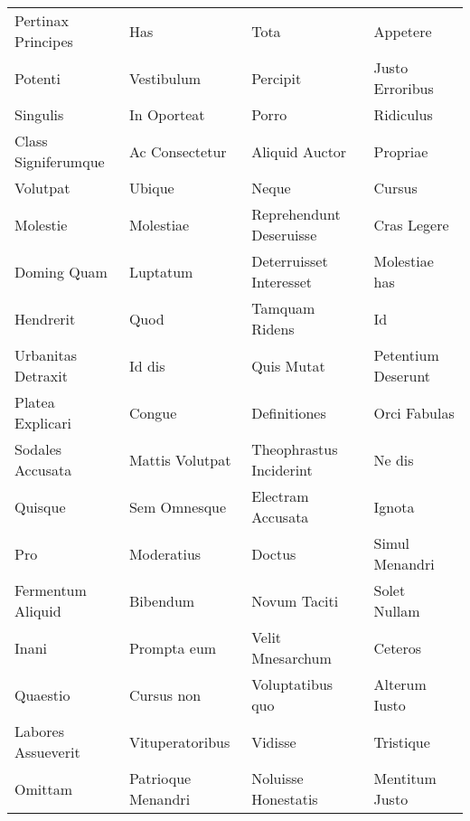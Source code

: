 \documentclass[a4paper]{article}
\begin{document}
\begin{longtable}{p{30mm}p{30mm}p{30mm}p{30mm}}
        Pertinax Principes & Has & Tota & Appetere\\

        Potenti & Vestibulum & Percipit & Justo Erroribus\\

        Singulis & In Oporteat & Porro & Ridiculus\\

        Class Signiferumque & Ac Consectetur & Aliquid Auctor & Propriae\\

        Volutpat & Ubique & Neque & Cursus\\

        Molestie & Molestiae & Reprehendunt Deseruisse & Cras Legere\\

        Doming Quam & Luptatum & Deterruisset Interesset & Molestiae has\\

        Hendrerit & Quod & Tamquam Ridens & Id\\

        Urbanitas Detraxit & Id dis & Quis Mutat & Petentium Deserunt\\

        Platea Explicari & Congue & Definitiones & Orci Fabulas\\

        Sodales Accusata & Mattis Volutpat & Theophrastus Inciderint & Ne dis\\

        Quisque & Sem Omnesque & Electram Accusata & Ignota\\

        Pro & Moderatius & Doctus & Simul Menandri\\

        Fermentum Aliquid & Bibendum & Novum Taciti & Solet Nullam\\

        Inani & Prompta eum & Velit Mnesarchum & Ceteros\\

        Quaestio & Cursus non & Voluptatibus quo & Alterum Iusto\\

        Labores Assueverit & Vituperatoribus & Vidisse & Tristique\\

        Omittam & Patrioque Menandri & Noluisse Honestatis & Mentitum Justo\\


\end{longtable}
\end{document}
